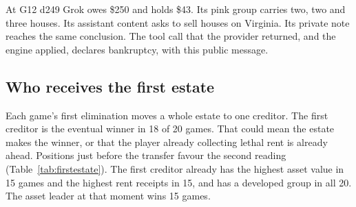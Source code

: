 At G12 d249 Grok owes \$250 and holds \$43. Its pink group carries two, two and three houses. Its assistant content asks to sell houses on Virginia.
Its private note reaches the same conclusion.
The tool call that the provider returned, and the engine applied, declares bankruptcy, with this public message.

\subsection{Who receives the first estate}

Each game's first elimination moves a whole estate to one creditor. The first creditor is the eventual winner in 18 of 20 games. That could mean the estate makes the winner, or that the player already collecting lethal rent is already ahead. Positions just before the transfer favour the second reading (Table~\ref{tab:firstestate}). The first creditor already has the highest asset value in 15 games and the highest rent receipts in 15, and has a developed group in all 20. The asset leader at that moment wins 15 games.


